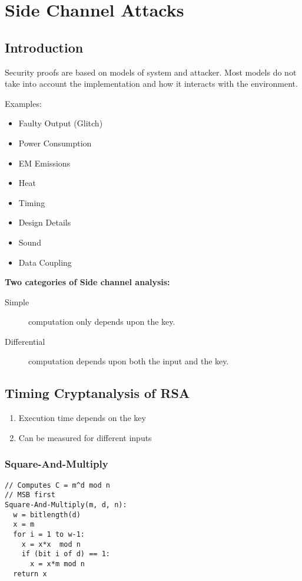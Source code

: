 
\section{Side Channel Attacks}
\subsection{Introduction}
Security proofs are based on models of system and attacker. Most models do not take
into account the implementation and how it interacts with the environment.

Examples:
\begin{itemize}
  \item Faulty Output (Glitch)
  \item Power Consumption
  \item EM Emissions
  \item Heat
  \item Timing
  \item Design Details
  \item Sound
  \item Data Coupling
\end{itemize}

\textbf{Two categories of Side channel analysis:}
\begin{description}
  \item[Simple] computation only depends upon the key.
  \item[Differential] computation depends upon both the input and the key.
\end{description}

\subsection{Timing Cryptanalysis of RSA}
\begin{enumerate}
  \item Execution time depends on the key
  \item Can be measured for different inputs
\end{enumerate}


\subsubsection{Square-And-Multiply}
\begin{lstlisting}
// Computes C = m^d mod n
// MSB first
Square-And-Multiply(m, d, n):
  w = bitlength(d)
  x = m
  for i = 1 to w-1:
    x = x*x  mod n
    if (bit i of d) == 1:
      x = x*m mod n
  return x
\end{lstlisting}


